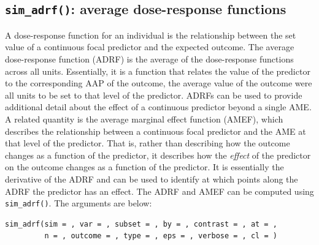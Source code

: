 \subsection{\texorpdfstring{\texttt{sim\_adrf()}: average dose-response functions}{sim\_adrf(): average dose-response functions}}\label{sim_adrf-average-dose-response-functions}
A dose-response function for an individual is the relationship between the set value of a continuous focal predictor and the expected outcome. The average dose-response function (ADRF) is the average of the dose-response functions across all units. Essentially, it is a function that relates the value of the predictor to the corresponding AAP of the outcome, the average value of the outcome were all units to be set to that level of the predictor. ADRFs can be used to provide additional detail about the effect of a continuous predictor beyond a single AME.
A related quantity is the average marginal effect function (AMEF), which describes the relationship between a continuous focal predictor and the AME at that level of the predictor. That is, rather than describing how the outcome changes as a function of the predictor, it describes how the \emph{effect} of the predictor on the outcome changes as a function of the predictor. It is essentially the derivative of the ADRF and can be used to identify at which points along the ADRF the predictor has an effect.
The ADRF and AMEF can be computed using \texttt{sim\_adrf()}. The arguments are below:
\begin{verbatim}
sim_adrf(sim = , var = , subset = , by = , contrast = , at = ,
         n = , outcome = , type = , eps = , verbose = , cl = )
\end{verbatim}
